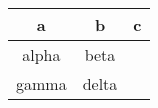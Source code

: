 \begin{table}
\centering
\begin{tabular}{ccc}
a 	 & b 	 & c \\ \hline \hline
alpha 	 & beta 	 &  \\ \hline
gamma 	 & delta 	 &  \\ \hline
 \hline
\end{tabular}
\end{table}